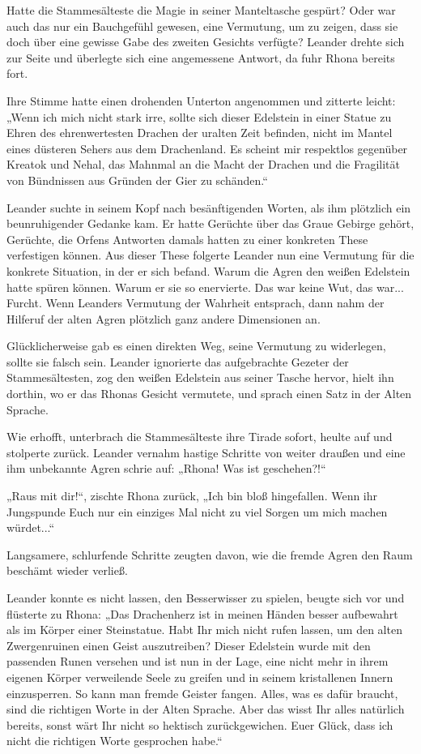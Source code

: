 Hatte die Stammesälteste die Magie in seiner Manteltasche gespürt? Oder war auch das nur ein Bauchgefühl gewesen, eine Vermutung, um zu zeigen, dass sie doch über eine gewisse Gabe des zweiten Gesichts verfügte? Leander drehte sich zur Seite und überlegte sich eine angemessene Antwort, da fuhr Rhona bereits fort.

Ihre Stimme hatte einen drohenden Unterton angenommen und zitterte leicht: „Wenn ich mich nicht stark irre, sollte sich dieser Edelstein in einer Statue zu Ehren des ehrenwertesten Drachen der uralten Zeit befinden, nicht im Mantel eines düsteren Sehers aus dem Drachenland. Es scheint mir respektlos gegenüber Kreatok und Nehal, das Mahnmal an die Macht der Drachen und die Fragilität von Bündnissen aus Gründen der Gier zu schänden.“

Leander suchte in seinem Kopf nach besänftigenden Worten, als ihm plötzlich ein beunruhigender Gedanke kam. Er hatte Gerüchte über das Graue Gebirge gehört, Gerüchte, die Orfens Antworten damals hatten zu einer konkreten These verfestigen können. Aus dieser These folgerte Leander nun eine Vermutung für die konkrete Situation, in der er sich befand. Warum die Agren den weißen Edelstein hatte spüren können. Warum er sie so enervierte. Das war keine Wut, das war... Furcht. Wenn Leanders Vermutung der Wahrheit entsprach, dann nahm der Hilferuf der alten Agren plötzlich ganz andere Dimensionen an.

Glücklicherweise gab es einen direkten Weg, seine Vermutung zu widerlegen, sollte sie falsch sein. Leander ignorierte das aufgebrachte Gezeter der Stammesältesten, zog den weißen Edelstein aus seiner Tasche hervor, hielt ihn dorthin, wo er das Rhonas Gesicht vermutete, und sprach einen Satz in der Alten Sprache.

Wie erhofft, unterbrach die Stammesälteste ihre Tirade sofort, heulte auf und stolperte zurück. Leander vernahm hastige Schritte von weiter draußen und eine ihm unbekannte Agren schrie auf: „Rhona! Was ist geschehen?!“

„Raus mit dir!“, zischte Rhona zurück, „Ich bin bloß hingefallen. Wenn ihr Jungspunde Euch nur ein einziges Mal nicht zu viel Sorgen um mich machen würdet...“

Langsamere, schlurfende Schritte zeugten davon, wie die fremde Agren den Raum beschämt wieder verließ.

Leander konnte es nicht lassen, den Besserwisser zu spielen, beugte sich vor und flüsterte zu Rhona: „Das Drachenherz ist in meinen Händen besser aufbewahrt als im Körper einer Steinstatue. Habt Ihr mich nicht rufen lassen, um den alten Zwergenruinen einen Geist auszutreiben? Dieser Edelstein wurde mit den passenden Runen versehen und ist nun in der Lage, eine nicht mehr in ihrem eigenen Körper verweilende Seele zu greifen und in seinem kristallenen Innern einzusperren. So kann man fremde Geister fangen. Alles, was es dafür braucht, sind die richtigen Worte in der Alten Sprache. Aber das wisst Ihr alles natürlich bereits, sonst wärt Ihr nicht so hektisch zurückgewichen. Euer Glück, dass ich nicht die richtigen Worte gesprochen habe.“

